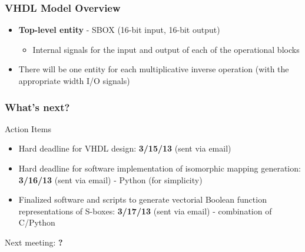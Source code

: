 \documentclass[handout]{beamer}
\begin{document}
\begin{frame}
	\frametitle{VHDL Model Overview}
	\begin{itemize}
		\item \textbf{Top-level entity} - SBOX (16-bit input, 16-bit output)
		\begin{itemize}
			\item Internal signals for the input and output of each of the operational blocks
		\end{itemize}
		\item There will be one entity for each multiplicative inverse operation (with the appropriate width I/O signals)
	\end{itemize}	
\end{frame}

\begin{frame}
	\frametitle{What's next?}
	\begin{center}
		Action Items
	\end{center}	
	\begin{itemize}
		\item Hard deadline for VHDL design: \textbf{3/15/13} (sent via email)
		\item Hard deadline for software implementation of isomorphic mapping generation: \textbf{3/16/13} (sent via email) - Python (for simplicity)
		\item Finalized software and scripts to generate vectorial Boolean function representations of S-boxes: \textbf{3/17/13} (sent via email) - combination of C/Python
	\end{itemize}
	\begin{center}
	Next meeting: \textbf{?}
	\end{center}
\end{frame}
\end{document}
